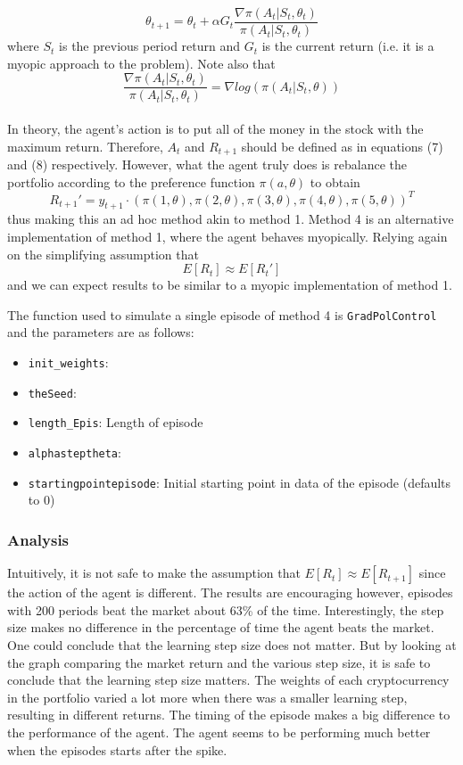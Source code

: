 \documentclass[a4paper,12pt]{article}
\newcommand{\code}[1]{\texttt{#1}}
\begin{document}
\begin{equation}
\theta_{t+1} = \theta_t + \alpha G_t \frac{\nabla \pi(A_t | S_t,\theta_t)}{\pi(A_t | S_t,\theta_t)}
\end{equation}
where $S_t$ is the previous period return and $G_t$ is the current return (i.e. it is a myopic approach to the problem). Note also that 
\begin{equation}
\frac{\nabla \pi(A_t | S_t,\theta_t)}{\pi(A_t | S_t,\theta_t)} = \nabla log(\pi(A_t|S_t,\theta))
\end{equation} \\
In theory, the agent's action is to put all of the money in the stock with the maximum return. Therefore, $A_t$ and $R_{t+1}$ should be defined as in equations (7) and (8) respectively. However, what the agent truly does is rebalance the portfolio according to the preference function $\pi(a,\theta)$ to obtain
\begin{equation}
R_{t+1}' = y_{t+1} \cdot (\pi(1,\theta),\pi(2,\theta),\pi(3,\theta),\pi(4,\theta),\pi(5,\theta))^T 
\end{equation}
thus making this an ad hoc method akin to method 1. Method 4 is  an alternative implementation of method 1, where the agent behaves myopically. Relying again on the simplifying assumption that 
$$E[R_t] \approx E[R_t']$$
and we can expect results to be similar to a myopic implementation of method 1.

The function used to simulate a single episode of method 4 is \code{GradPolControl} and the parameters are as follows:
\begin{itemize}
  \item \code{init\_weights}: 
  \item \code{theSeed}: 
  \item \code{length\_Epis}: Length of episode
  \item \code{alphasteptheta}: 
  \item \code{startingpointepisode}: Initial starting point in data of the episode (defaults to 0)
\end{itemize}

\subsubsection{Analysis}
Intuitively, it is not safe to make the assumption that $E[R_t] \approx E[R_{t+1}]$ since the action of the agent is different. The results are encouraging however, episodes with 200 periods beat the market about 63\% of the time. Interestingly, the step size makes no difference in the percentage of time the agent beats the market. One could conclude that the learning step size  does not matter. But by looking at the graph comparing the market return and the various step size, it is safe to conclude that the learning step size matters. The weights of each cryptocurrency in the portfolio varied a lot more when there was a smaller learning step, resulting in different returns. The timing of the episode makes a big difference to the performance of the agent. The agent seems to be performing much better when the episodes starts after the spike. \par
\end{document}
